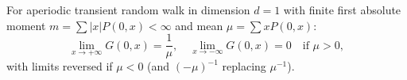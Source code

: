 For aperiodic transient random walk in dimension \(d = 1\) with finite first absolute moment \(m = \sum |x| P(0,x) < \infty\) and mean \(\mu = \sum x P(0,x)\):
\[
\lim_{x \to +\infty} G(0,x) = \frac{1}{\mu}, \quad \lim_{x \to -\infty} G(0,x) = 0 \quad \text{if } \mu > 0,
\]
with limits reversed if \(\mu < 0\) (and \((-\mu)^{-1}\) replacing \(\mu^{-1}\)).
